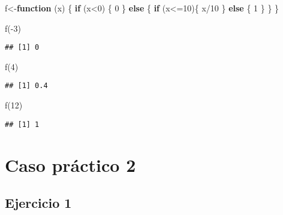 \documentclass[
]{article}
\newenvironment{Shaded}{\begin{snugshade}}{\end{snugshade}}
\newcommand{\ControlFlowTok}[1]{\textcolor[rgb]{0.13,0.29,0.53}{\textbf{#1}}}
\newcommand{\DecValTok}[1]{\textcolor[rgb]{0.00,0.00,0.81}{#1}}
\newcommand{\FunctionTok}[1]{\textcolor[rgb]{0.00,0.00,0.00}{#1}}
\newcommand{\NormalTok}[1]{#1}
\newcommand{\OtherTok}[1]{\textcolor[rgb]{0.56,0.35,0.01}{#1}}
\newcommand{\SpecialCharTok}[1]{\textcolor[rgb]{0.00,0.00,0.00}{#1}}
\begin{document}
\begin{Shaded}
\begin{Highlighting}[]
\NormalTok{f}\OtherTok{\textless{}{-}}\ControlFlowTok{function}\NormalTok{ (x) \{}
  \ControlFlowTok{if}\NormalTok{ (x}\SpecialCharTok{\textless{}}\DecValTok{0}\NormalTok{) \{}
    \DecValTok{0}
\NormalTok{  \} }\ControlFlowTok{else}\NormalTok{ \{}
      \ControlFlowTok{if}\NormalTok{ (x}\SpecialCharTok{\textless{}=}\DecValTok{10}\NormalTok{)\{}
\NormalTok{        x}\SpecialCharTok{/}\DecValTok{10}
\NormalTok{      \}}
      \ControlFlowTok{else}\NormalTok{ \{}
        \DecValTok{1}
\NormalTok{      \}}
\NormalTok{  \}}
\NormalTok{\}}

\FunctionTok{f}\NormalTok{(}\SpecialCharTok{{-}}\DecValTok{3}\NormalTok{)}
\end{Highlighting}
\end{Shaded}

\begin{verbatim}
## [1] 0
\end{verbatim}

\begin{Shaded}
\begin{Highlighting}[]
\FunctionTok{f}\NormalTok{(}\DecValTok{4}\NormalTok{)}
\end{Highlighting}
\end{Shaded}

\begin{verbatim}
## [1] 0.4
\end{verbatim}

\begin{Shaded}
\begin{Highlighting}[]
\FunctionTok{f}\NormalTok{(}\DecValTok{12}\NormalTok{)}
\end{Highlighting}
\end{Shaded}

\begin{verbatim}
## [1] 1
\end{verbatim}

\hypertarget{caso-pruxe1ctico-2}{%
\section{Caso práctico 2}\label{caso-pruxe1ctico-2}}

\hypertarget{ejercicio-1-1}{%
\subsection{Ejercicio 1}\label{ejercicio-1-1}}
\end{document}
